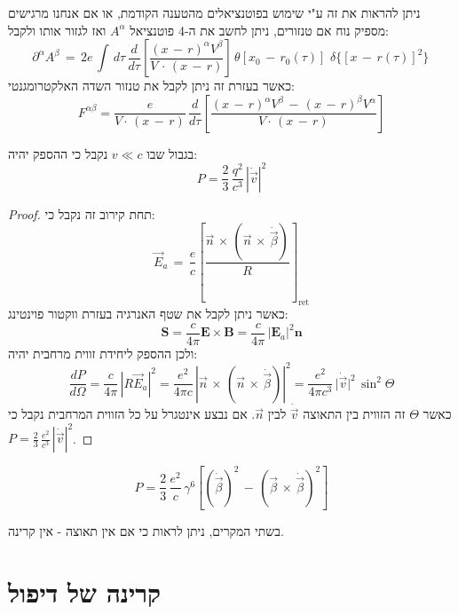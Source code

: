 \documentclass{tstextbook}
\begin{document}
ניתן להראות את זה ע"י שימוש בפוטנציאלים מהטענה הקודמת, או אם אנחנו מרגישים מספיק נוח אם טנזורים, ניתן לחשב את ה-4 פוטנציאל \(A^{\alpha}\) ואז לגזור אותו ולקבל:
$$\partial^{\alpha}A^{\beta}\,=\,2e\,\int\,d\tau\,\frac{d}{d\tau}\left[\frac{(x\,-\,r)^{\alpha}V^{\beta}}{V\,\cdot\,(x\,-\,r)}\right]\,\theta[x_{0}\,-\,r_{0}(\tau)]\,\,\delta\{[x\,-\,r(\tau)]^{2}\}\,$$
כאשר בעזרת זה ניתן לקבל את טנזור השדה האלקטרומגנטי:
$$F^{\alpha\beta}=\frac{e}{V\cdot\,(x\,-\,r)}\,\frac{d}{d\tau}\left[\frac{(x\,-\,r)^{\alpha}V^{\beta}\,-\,(x\,-\,r)^{\beta}V^{\alpha}}{V\cdot\,(x\,-\,r)}\right]$$

\begin{proposition}
בגבול שבו \(v\ll c\) נקבל כי ההספק יהיה:
$$P={\frac{2}{3}}\,{\frac{q^{2}}{c^{3}}}\,|{\dot{\vec{v}}}|^{2}$$

\end{proposition}
\begin{proof}
תחת קירוב זה נקבל כי:
$$\vec{E}_{a}\,=\,{\frac{e}{c}}\left[{\frac{\vec{n}\,\times\,(\vec{n}\,\times\,{\dot{\vec{\beta}}})}{R}}\right]_{\mathrm{ret}}$$
כאשר ניתן לקבל את שטף האנרגיה בעזרת ווקטור פוינטינג:
$${\textbf{S}}={\frac{c}{4\pi}}{\textbf{E}}\times{\textbf{B}}={\frac{c}{4\pi}}\,|{\textbf{E}}_{a}|^{2}{\textbf{n}}$$
ולכן ההספק ליחידת זווית מרחבית יהיה:
$$\frac{d P}{d\Omega}=\frac{c}{4\pi}\,|R{\vec E}_{a}|^{2}=\frac{e^{2}}{4\pi c}\,|{\vec n}\,\times\,({\vec n}\,\times\,{\dot{\vec\beta}})|^{2}={\frac{e^{2}}{4\pi c^{3}}}\,\vert{\dot{\vec{v}}}\vert^{2}\,\sin^{2}\!\Theta$$
כאשר \(\Theta\) זה הזווית בין התאוצה \(\dot{\vec{v}}\) לבין \(\vec{n}\). אם נבצע אינטגרל על כל הזווית המרחבית נקבל כי \(P={\frac{2}{3}}\,{\frac{e^{2}}{c^{3}}}\,|{\dot{\vec{v}}}|^{2}\).

\end{proof}
\begin{proposition}
$$P=\frac{2}{3}\,\frac{e^{2}}{c}\,\gamma^{6}[(\dot{\vec\beta})^{2}\,-\,({\vec\beta}\,\times\,\dot{\vec\beta})^{2}]$$

\end{proposition}
\begin{remark}
בשתי המקרים, ניתן לראות כי אם אין תאוצה - אין קרינה.

\end{remark}
\section{קרינה של דיפול}
\end{document}
